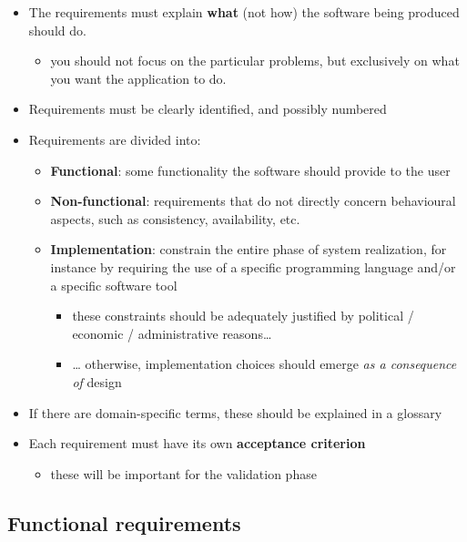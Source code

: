 \documentclass{scrartcl}
\begin{document}
\begin{itemize}
  \item The requirements must explain \textbf{what} (not how) the software
  being produced should do.
  \begin{itemize}
    \item you should not focus on the particular problems, but exclusively on
    what you want the application to do.
  \end{itemize}

  \item Requirements must be clearly identified, and possibly numbered

  \item Requirements are divided into:
  \begin{itemize}
    \item \textbf{Functional}: some functionality the software should provide to the user

    \item \textbf{Non-functional}: requirements that do not directly concern behavioural aspects, such as consistency, availability, etc.

    \item \textbf{Implementation}: constrain the entire phase of system realization, 
    for instance by requiring the use of a specific programming language and/or a specific software tool
    \begin{itemize}
      \item these constraints should be adequately justified by political / economic / administrative reasons\ldots{}
      \item \ldots{} otherwise, implementation choices should emerge \emph{as  a consequence of} design
    \end{itemize}
  \end{itemize}

  \item If there are domain-specific terms, these should be explained in a glossary
  
  \item Each requirement must have its own \textbf{acceptance criterion}
  \begin{itemize}
    \item these will be important for the validation phase
  \end{itemize}
\end{itemize}

\subsection{Functional requirements}\label{functional-requirements}
\end{document}
